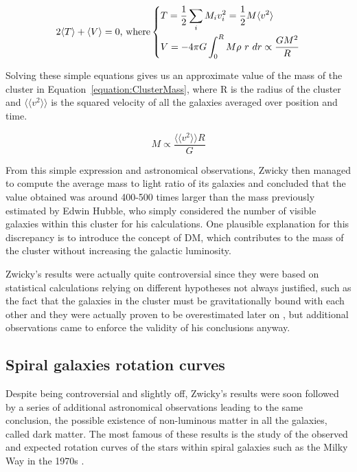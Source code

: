 \documentclass[a4paper, 10pt, openright]{report}
\begin{document}
\begin{equation} \label{equation:Virial}
2 \langle T \rangle + \langle V \rangle = 0 \text{, where}
\begin{dcases}
T = \frac{1}{2} \sum_i M_i v_i^2 = \frac{1}{2} M \langle v^2 \rangle\\
V = -4 \pi G \int_0^R M \rho \text{ } r \text{ } dr \propto \frac{G M^2}{R}
\end{dcases}
\end{equation}

Solving these simple equations gives us an approximate value of the mass of the cluster in Equation~\ref{equation:ClusterMass}, where R is the radius of the cluster and $\langle \langle v^2 \rangle \rangle$ is the squared velocity of all the galaxies averaged over position and time.

\begin{equation} \label{equation:ClusterMass}
M \propto \frac{\langle \langle v^2 \rangle \rangle R}{G}
\end{equation} 

From this simple expression and astronomical observations, Zwicky then managed to compute the average mass to light ratio of its galaxies and concluded that the value obtained was around 400-500 times larger than the mass previously estimated by Edwin Hubble, who simply considered the number of visible galaxies within this cluster for his calculations. One plausible explanation for this discrepancy is to introduce the concept of \ac{DM}, which contributes to the mass of the cluster without increasing the galactic luminosity.

Zwicky's results were actually quite controversial since they were based on statistical calculations relying on different hypotheses not always justified, such as the fact that the galaxies in the cluster must be gravitationally bound with each other and they were actually proven to be overestimated later on \cite{ZwickyWrong}, but additional observations came to enforce the validity of his conclusions anyway.

\subsection{Spiral galaxies rotation curves}

Despite being controversial and slightly off, Zwicky's results were soon followed by a series of additional astronomical observations leading to the same conclusion, the possible existence of non-luminous matter in all the galaxies, called dark matter. The most famous of these results is the study of the observed and expected rotation curves of the stars within spiral galaxies such as the Milky Way in the 1970s \cite{RotationCurves}. 
\end{document}

